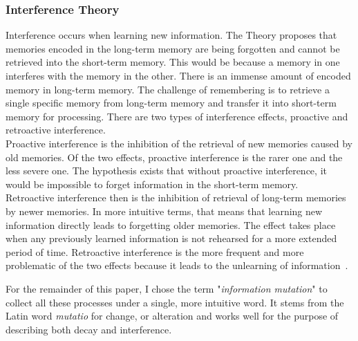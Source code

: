 \subsubsection{Interference Theory}
Interference occurs when learning new information. The Theory proposes that memories encoded in the long-term memory are being forgotten and cannot be retrieved into the short-term memory. This would be because a memory in one interferes with the memory in the other. There is an immense amount of encoded memory in long-term memory. The challenge of remembering is to retrieve a single specific memory from long-term memory and transfer it into short-term memory for processing. There are two types of interference effects, proactive and retroactive interference.~\cite{Edwards2010}\\
Proactive interference is the inhibition of the retrieval of new memories caused by old memories. Of the two effects, proactive interference is the rarer one and the less severe one. The hypothesis exists that without proactive interference, it would be impossible to forget information in the short-term memory.~\cite{Keppel1962}\\
Retroactive interference then is the inhibition of retrieval of long-term memories by newer memories. In more intuitive terms, that means that learning new information directly leads to forgetting older memories. The effect takes place when any previously learned information is not rehearsed for a more extended period of time. Retroactive interference is the more frequent and more problematic of the two effects because it leads to the unlearning of information~\cite{Melton1941}.~\cite{Edwards2010}\newline

For the remainder of this paper, I chose the term "\textit{information mutation}" to collect all these processes under a single, more intuitive word. It stems from the Latin word \textit{mutatio} for change, or alteration and works well for the purpose of describing both decay and interference. 
